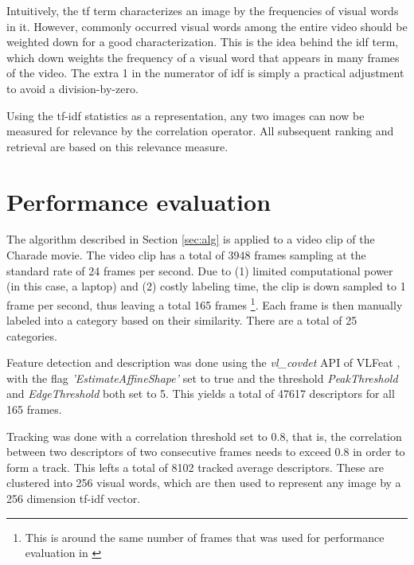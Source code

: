 \documentclass[conference]{IEEEtran}
\begin{document}
Intuitively, the tf term characterizes an image by the frequencies of visual words in it. However, commonly occurred visual words among the entire
video should be weighted down for a good characterization. This is the idea behind the idf term, which down weights the frequency of a visual word
that appears in many frames of the video. The extra 1 in the numerator of idf is simply a practical adjustment to avoid a division-by-zero.

Using the tf-idf statistics as a representation, any two images can now be measured for relevance by the correlation operator. All subsequent ranking 
and retrieval are based on this relevance measure.

\section{Performance evaluation}
\label{sec:perf}
The algorithm described in Section \ref{sec:alg} is applied to a video clip of the Charade movie. The video clip has a total of 3948 frames sampling at
the standard rate of 24 frames per second. Due to (1) limited computational power (in this case, a laptop) and (2) costly labeling time, the clip is down sampled to 1 frame per second, thus leaving a total 165 frames \footnote{This is around the same number of frames that was used for performance evaluation in \cite{sivic2003video} }. Each frame is then manually labeled into a category based on their similarity. There are 
a total of 25 categories.

Feature detection and description was done using the  {\it vl\_covdet} API of VLFeat \cite{vedaldi08vlfeat}, with the flag {\it 'EstimateAffineShape'} 
set to true and the threshold {\it PeakThreshold} and {\it EdgeThreshold} both set to 5. This yields a total of 47617 descriptors for all 165 frames.

Tracking was done with a correlation threshold set to 0.8, that is, the correlation between two descriptors of two consecutive frames needs to exceed 0.8
in order to form a track. This lefts a total of 8102 tracked average descriptors. These are clustered into 256 visual words, which are then used to represent 
any image by a 256 dimension tf-idf vector.
\end{document}

